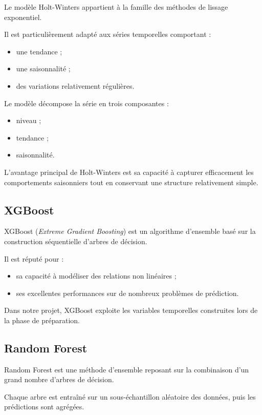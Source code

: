 \documentclass[12pt,a4paper,twoside]{report}
\begin{document}
Le modèle Holt-Winters appartient à la famille des méthodes de lissage exponentiel.

Il est particulièrement adapté aux séries temporelles comportant :

\begin{itemize}
    \item une tendance ;
    \item une saisonnalité ;
    \item des variations relativement régulières.
\end{itemize}

Le modèle décompose la série en trois composantes :

\begin{itemize}
    \item niveau ;
    \item tendance ;
    \item saisonnalité.
\end{itemize}

L'avantage principal de Holt-Winters est sa capacité à capturer efficacement les comportements saisonniers tout en conservant une structure relativement simple.

\subsection{XGBoost}

XGBoost (\textit{Extreme Gradient Boosting}) est un algorithme d'ensemble basé sur la construction séquentielle d'arbres de décision.

Il est réputé pour :

\begin{itemize}
    \item sa capacité à modéliser des relations non linéaires ;
    \item ses excellentes performances sur de nombreux problèmes de prédiction.
\end{itemize}

Dans notre projet, XGBoost exploite les variables temporelles construites lors de la phase de préparation.

\subsection{Random Forest}

Random Forest est une méthode d'ensemble reposant sur la combinaison d'un grand nombre d'arbres de décision.

Chaque arbre est entraîné sur un sous-échantillon aléatoire des données, puis les prédictions sont agrégées.
\end{document}
